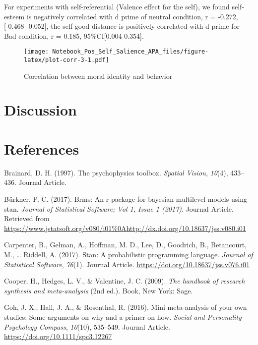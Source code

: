\documentclass[
  english,
  man]{apa6}
\begin{document}
For experiments with self-referential (Valence effect for the self), we found self-esteem is negatively correlated with d prime of neutral condition, r = -0.272, {[}-0.468 -0.052{]}, the self-good distance is positively correlated with d prime for Bad condition, r = 0.185, 95\%CI{[}0.004 0.354{]}.

\begin{figure}
\centering
\texttt{[image: Notebook\_Pos\_Self\_Salience\_APA\_files/figure-latex/plot-corr-3-1.pdf]}
\caption{\label{fig:plot-corr-3}Correlation between moral identity and behavior}
\end{figure}

\hypertarget{discussion}{%
\section{Discussion}\label{discussion}}

\hypertarget{references}{%
\section{References}\label{references}}

\begingroup
\setlength{\parindent}{-0.5in}
\setlength{\leftskip}{0.5in}

\hypertarget{refs}{}
\leavevmode\hypertarget{ref-Brainard_1997}{}%
Brainard, D. H. (1997). The psychophysics toolbox. \emph{Spatial Vision}, \emph{10}(4), 433--436. Journal Article.

\leavevmode\hypertarget{ref-Buxfcrkner_2017}{}%
Bürkner, P.-C. (2017). Brms: An r package for bayesian multilevel models using stan. \emph{Journal of Statistical Software; Vol 1, Issue 1 (2017)}. Journal Article. Retrieved from \url{https://www.jstatsoft.org/v080/i01\%0Ahttp://dx.doi.org/10.18637/jss.v080.i01}

\leavevmode\hypertarget{ref-Carpenter_2017_stan}{}%
Carpenter, B., Gelman, A., Hoffman, M. D., Lee, D., Goodrich, B., Betancourt, M., \ldots{} Riddell, A. (2017). Stan: A probabilistic programming language. \emph{Journal of Statistical Software}, \emph{76}(1). Journal Article. \url{https://doi.org/10.18637/jss.v076.i01}

\leavevmode\hypertarget{ref-Cooper_2009_handbook}{}%
Cooper, H., Hedges, L. V., \& Valentine, J. C. (2009). \emph{The handbook of research synthesis and meta-analysis} (2nd ed.). Book, New York: Sage.

\leavevmode\hypertarget{ref-Goh_2016_mini}{}%
Goh, J. X., Hall, J. A., \& Rosenthal, R. (2016). Mini meta-analysis of your own studies: Some arguments on why and a primer on how. \emph{Social and Personality Psychology Compass}, \emph{10}(10), 535--549. Journal Article. \url{https://doi.org/10.1111/spc3.12267}
\end{document}
